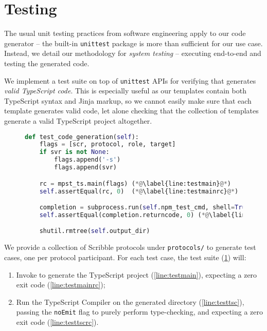 \section{Testing}

The usual unit testing practices from software engineering
apply to our code generator -- the built-in \texttt{unittest} 
package is more than sufficient for our use case. 
Instead, we detail our methodology for \textit{system testing} -- 
executing  end-to-end and testing
the generated code.

We implement a test suite on top of \texttt{unittest} APIs
for verifying that 
generates \textit{valid TypeScript code}. This is especially useful as
our templates contain both TypeScript syntax and Jinja markup, 
so we cannot easily make sure that each template generates valid code,
let alone checking that the collection of templates generate a valid
TypeScript project altogether.

\begin{figure}[!ht]
\begin{lstlisting}[language=python,tabsize=4]
def test_code_generation(self):
	flags = [scr, protocol, role, target]
	if svr is not None:
		flags.append('-s')
		flags.append(svr)

	rc = mpst_ts.main(flags) (*@\label{line:testmain}@*)
	self.assertEqual(rc, 0)  (*@\label{line:testmainrc}@*)

	completion = subprocess.run(self.npm_test_cmd, shell=True) (*@\label{line:testtsc}@*)
	self.assertEqual(completion.returncode, 0) (*@\label{line:testtscrc}@*)

	shutil.rmtree(self.output_dir)
\end{lstlisting}
\label{lst:systemtest}
\end{figure}

We provide a collection of Scribble protocols under \texttt{protocols/}
to generate test cases, one per protocol participant.
For each test case, the test suite (\cref{lst:systemtest}) will:

\begin{enumerate}
\item Invoke  to generate the TypeScript project 
(\cref{line:testmain}), 
expecting a zero exit code (\cref{line:testmainrc});
\item Run the TypeScript Compiler on the generated directory 
(\cref{line:testtsc}),
passing the \texttt{noEmit} flag to purely perform type-checking,
and expecting a zero exit code (\cref{line:testtscrc}).
\end{enumerate}

